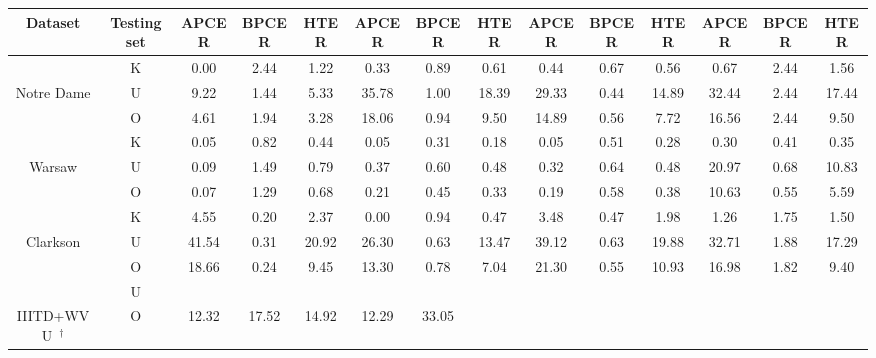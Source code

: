 \begin{table*}[!hb]
\begin{tabular}{cc||c|c|c||c|c|c||c|c|c||c|c|c}
    \textbf{Dataset} & \textbf{Testing set} & \textbf{APCER} & \textbf{BPCER} & \textbf{HTER} 
                                            & \textbf{APCER} & \textbf{BPCER} & \textbf{HTER} 
                                            & \textbf{APCER} & \textbf{BPCER} & \textbf{HTER} 
                                            & \textbf{APCER} & \textbf{BPCER} & \textbf{HTER} \\
    \hline\hline
			                    & K    & 0.00    & 2.44    & 1.22    & 0.33    & 0.89    & 0.61	   & 0.44   & 0.67  & 0.56  & 0.67    & 2.44    & 1.56    \\
    Notre Dame            		& U    & 9.22    & 1.44    & 5.33    & 35.78   & 1.00    & 18.39   & 29.33  & 0.44  & 14.89 & 32.44   & 2.44    & 17.44   \\
							    & O    & 4.61    & 1.94    & 3.28    & 18.06   & 0.94    & 9.50	   & 14.89  & 0.56  & 7.72  & 16.56   & 2.44    & 9.50    \\
    \midrule                               	
								& K    & 0.05    & 0.82    & 0.44    & 0.05    & 0.31	 & 0.18	   & 0.05   & 0.51  & 0.28  & 0.30    & 0.41    & 0.35    \\
    Warsaw                		& U    & 0.09    & 1.49    & 0.79    & 0.37	   & 0.60	 & 0.48    & 0.32   & 0.64  & 0.48  & 20.97   & 0.68    & 10.83   \\
						        & O    & 0.07    & 1.29    & 0.68    & 0.21	   & 0.45	 & 0.33	   & 0.19   & 0.58  & 0.38  & 10.63   & 0.55    & 5.59    \\
    \midrule                    
                                & K    & 4.55    & 0.20    & 2.37    & 0.00    & 0.94    & 0.47	   & 3.48   & 0.47  & 1.98  & 1.26    & 1.75    & 1.50    \\
    Clarkson              		& U    & 41.54   & 0.31    & 20.92   & 26.30   & 0.63    & 13.47   & 39.12  & 0.63  & 19.88 & 32.71   & 1.88    & 17.29   \\
								& O    & 18.66   & 0.24    & 9.45	 & 13.30   & 0.78    & 7.04	   & 21.30  & 0.55  & 10.93 & 16.98   & 1.82    & 9.40    \\
    \midrule
								& U    &  	     &         &         &         &         &         &        &       &       &         &         &         \\
    \multirow{-2}{*}{IIITD+WVU~$^\dagger$} 
                                & O    & \multirow{-2}{*}{12.32}	
												 & \multirow{-2}{*}{17.52}
												 & \multirow{-2}{*}{14.92}
												 & \multirow{-2}{*}{12.29}
												 & \multirow{-2}{*}{33.05}

\end{tabular}
\end{table*}
